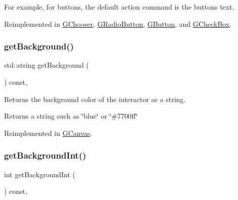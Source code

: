 For example, for buttons, the default action command is the button\textquotesingle{}s text. 

Reimplemented in \mbox{\hyperlink{classsgl_1_1GChooser_a4f83505141da1f8446f0e0e0a9507930}{G\+Chooser}}, \mbox{\hyperlink{classsgl_1_1GRadioButton_a4f83505141da1f8446f0e0e0a9507930}{G\+Radio\+Button}}, \mbox{\hyperlink{classsgl_1_1GButton_a4f83505141da1f8446f0e0e0a9507930}{G\+Button}}, and \mbox{\hyperlink{classsgl_1_1GCheckBox_a4f83505141da1f8446f0e0e0a9507930}{G\+Check\+Box}}.

\mbox{\label{classsgl_1_1GInteractor_a808e22cc1fdfbecf71ed8c64ef4600e0}} 
\subsubsection{\texorpdfstring{get\+Background()}{getBackground()}}
{\footnotesize\ttfamily std\+::string get\+Background (\begin{DoxyParamCaption}{ }\end{DoxyParamCaption}) const\hspace{0.3cm}{\ttfamily [virtual]}, {\ttfamily [inherited]}}



Returns the background color of the interactor as a string. 

\begin{DoxyReturn}{Returns}
a string such as \char`\"{}blue\char`\"{} or \char`\"{}\#7700ff\char`\"{} 
\end{DoxyReturn}


Reimplemented in \mbox{\hyperlink{classsgl_1_1GCanvas_a4a62c51b7244a7642b88065e3a07ae82}{G\+Canvas}}.

\mbox{\label{classsgl_1_1GInteractor_a9e827257a55cb8cf4d9de2ec6bcfd7a0}} 
\subsubsection{\texorpdfstring{get\+Background\+Int()}{getBackgroundInt()}}
{\footnotesize\ttfamily int get\+Background\+Int (\begin{DoxyParamCaption}{ }\end{DoxyParamCaption}) const\hspace{0.3cm}{\ttfamily [virtual]}, {\ttfamily [inherited]}}



